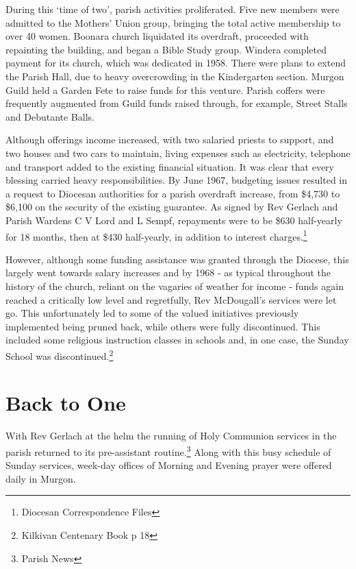 During this `time of two', parish activities proliferated. Five new members were admitted to the Mothers' Union group, bringing the total active membership to over 40 women. Boonara church liquidated its overdraft, proceeded with repainting the building, and began a Bible Study group. Windera completed payment for its church, which was dedicated in 1958. There were plans to extend the Parish Hall, due to heavy overcrowding in the Kindergarten section. Murgon Guild held a Garden Fete to raise funds for this venture. Parish coffers were frequently augmented from Guild funds raised through, for example, Street Stalls and Debutante Balls.

Although offerings income increased, with two salaried priests to support, and two houses and two cars to maintain, living expenses such as electricity, telephone and transport added to the existing financial situation. It was clear that every blessing carried heavy responsibilities. By June 1967, budgeting issues resulted in a request to Diocesan authorities for a parish overdraft increase, from \$4,730 to \$6,100 on the security of the existing guarantee. As signed by Rev Gerlach and Parish Wardens C V Lord and L Sempf, repayments were to be \$630 half-yearly for 18 months, then at \$430 half-yearly, in addition to interest charges.\footnote{Diocesan Correspondence Files}

However, although some funding assistance was granted through the Diocese, this largely went towards salary increases and by 1968 - as typical throughout the history of the church, reliant on the vagaries of weather for income - funds again reached a critically low level and regretfully, Rev McDougall's services were let go. This unfortunately led to some of the valued initiatives previously implemented being pruned back, while others were fully discontinued. This included some religious instruction classes in schools and, in one case, the Sunday School was discontinued.\footnote{Kilkivan Centenary Book p 18}

\hypertarget{back-to-one}{%
\section{Back to One}\label{back-to-one}}

With Rev Gerlach at the helm the running of Holy Communion services in the parish returned to its pre-assistant routine.\footnote{Parish News} Along with this busy schedule of Sunday services, week-day offices of Morning and Evening prayer were offered daily in Murgon.

